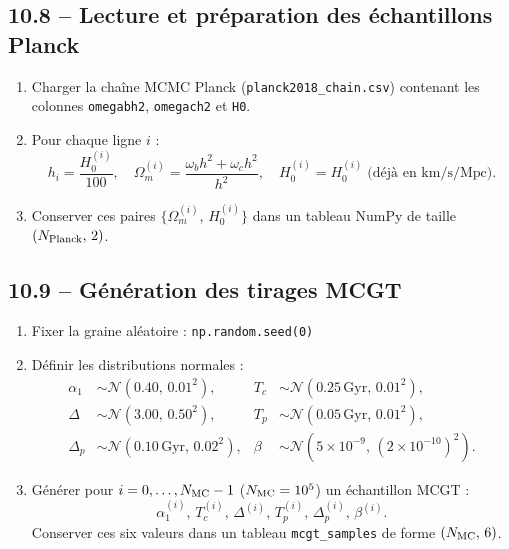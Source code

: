 \subsection{10.8 – Lecture et préparation des échantillons Planck}
\begin{enumerate}
  \item Charger la chaîne MCMC Planck (\texttt{planck2018\_chain.csv}) contenant les colonnes \texttt{omegabh2}, \texttt{omegach2} et \texttt{H0}.
  \item Pour chaque ligne \(i\) :
    \[
      h_{i} = \frac{H_{0}^{(i)}}{100},
      \quad
      \Omega_{m}^{(i)} = \frac{\omega_{b}h^{2} + \omega_{c}h^{2}}{h^{2}},
      \quad
      H_{0}^{(i)} = H_{0}^{(i)}\;\text{(déjà en km/s/Mpc)}.
    \]
  \item Conserver ces paires \(\{\Omega_{m}^{(i)},\,H_{0}^{(i)}\}\) dans un tableau NumPy de taille \((N_{\rm Planck},\,2)\).
\end{enumerate}

\subsection{10.9 – Génération des tirages MCGT}
\begin{enumerate}
  \item Fixer la graine aléatoire :
    \verb|np.random.seed(0)|

  \item Définir les distributions normales :
    \begin{align*}
      \alpha_{1} &\sim \mathcal{N}(0.40,\,0.01^{2}), &
      T_{c} &\sim \mathcal{N}(0.25\,\mathrm{Gyr},\,0.01^{2}), \\
      \Delta &\sim \mathcal{N}(3.00,\,0.50^{2}), &
      T_{p} &\sim \mathcal{N}(0.05\,\mathrm{Gyr},\,0.01^{2}), \\
      \Delta_{p} &\sim \mathcal{N}(0.10\,\mathrm{Gyr},\,0.02^{2}), &
      \beta &\sim \mathcal{N}(5\times10^{-9},\,(2\times10^{-10})^{2}).
    \end{align*}

  \item Générer pour \(i=0,\dots,N_{\rm MC}-1\) (\(N_{\rm MC}=10^{5}\)) un échantillon MCGT :
    \[
      \alpha_{1}^{(i)},\,T_{c}^{(i)},\,\Delta^{(i)},\,T_{p}^{(i)},\,\Delta_{p}^{(i)},\,\beta^{(i)}.
    \]
    Conserver ces six valeurs dans un tableau \texttt{mcgt\_samples} de forme \((N_{\rm MC},\,6)\).
\end{enumerate}


